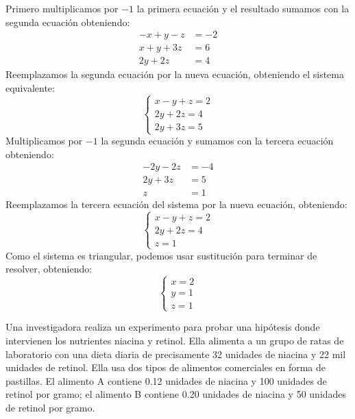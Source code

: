 \documentclass[11pt,respuestas,a4]{aleph-examen}
\begin{document}
\begin{preguntas}
\begin{respuesta}
\begin{enumerate}[label=\textit{\alph*)}]
        Primero multiplicamos por $-1$ la primera ecuaci\'on y el resultado sumamos con la segunda ecuaci\'on obteniendo:
        $$
        \begin{aligned}
        	-x + y - z &= -2 \\
        	x + y + 3z &= 6 \\ \hline
        	2y + 2z &= 4
        \end{aligned}
        $$
        Reemplazamos la segunda ecuaci\'on por la nueva ecuaci\'on, obteniendo el sistema equivalente:
        $$
        \begin{cases}
        	x - y  + z = 2 \\
        	2y + 2z = 4 \\
        	2y + 3z = 5
        \end{cases}
        $$
        Multiplicamos por $-1$ la segunda ecuaci\'on y sumamos con la tercera ecuaci\'on obteniendo:
        $$
        \begin{aligned}
        	-2y -2 z  &= -4 \\
        	2y + 3z &= 5 \\ \hline
        	z &= 1
        \end{aligned}
        $$
        Reemplazamos la tercera ecuaci\'on del sistema por la nueva ecuaci\'on, obteniendo:
        $$
        \begin{cases}
        	x - y  + z = 2 \\
        	2y + 2z = 4 \\
        	z = 1
        \end{cases}
        $$
        Como el sistema es triangular, podemos usar sustituci\'on para terminar de resolver, obteniendo:
        $$
        \begin{cases}
        	x = 2 \\
        	y = 1 \\
        	z = 1
        \end{cases}
        $$
    \end{enumerate}
\end{respuesta}
\item Una investigadora realiza un experimento para probar una hipótesis donde intervienen los nutrientes niacina y retinol. Ella alimenta a un grupo de ratas de laboratorio con una dieta diaria de precisamente 32 unidades de niacina y 22 mil unidades de retinol. Ella usa dos tipos de alimentos comerciales en forma de pastillas. El alimento A contiene 0.12 unidades de niacina y 100 unidades de retinol por gramo; el alimento B contiene 0.20 unidades de niacina y 50 unidades de retinol por gramo.


\end{preguntas}
\end{document}
